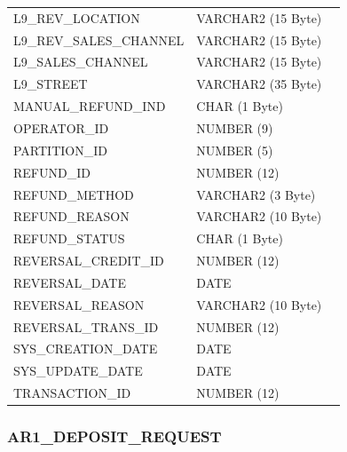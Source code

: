 \documentclass[12pt,twoside]{article}
\begin{document}
\begin{longtable}{lll}
 L9\_REV\_LOCATION              &  VARCHAR2 (15 Byte)  &                        \\
 L9\_REV\_SALES\_CHANNEL        &  VARCHAR2 (15 Byte)  &                        \\
 L9\_SALES\_CHANNEL             &  VARCHAR2 (15 Byte)  &                        \\
 L9\_STREET                     &  VARCHAR2 (35 Byte)  &                        \\
 MANUAL\_REFUND\_IND            &  CHAR (1 Byte)       &                        \\
 OPERATOR\_ID                   &  NUMBER (9)          &                        \\
 PARTITION\_ID                  &  NUMBER (5)          &                        \\
 REFUND\_ID                     &  NUMBER (12)         &                        \\
 REFUND\_METHOD                 &  VARCHAR2 (3 Byte)   &                        \\
 REFUND\_REASON                 &  VARCHAR2 (10 Byte)  &                        \\
 REFUND\_STATUS                 &  CHAR (1 Byte)       &                        \\
 REVERSAL\_CREDIT\_ID           &  NUMBER (12)         &                        \\
 REVERSAL\_DATE                 &  DATE                &                        \\
 REVERSAL\_REASON               &  VARCHAR2 (10 Byte)  &                        \\
 REVERSAL\_TRANS\_ID            &  NUMBER (12)         &                        \\
 SYS\_CREATION\_DATE            &  DATE                &                        \\
 SYS\_UPDATE\_DATE              &  DATE                &                        \\
 TRANSACTION\_ID                &  NUMBER (12)         &                        \\
\hline
\end{longtable}


\normalsize
\subsubsection{AR1\_DEPOSIT\_REQUEST}
\label{sec-11-6-8}
\end{document}
